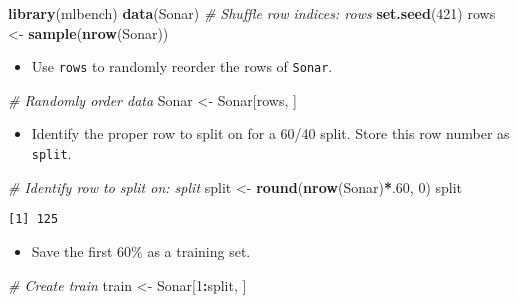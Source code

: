 \documentclass[
]{book}
\newenvironment{Shaded}{\begin{snugshade}}{\end{snugshade}}
\newcommand{\CommentTok}[1]{\textcolor[rgb]{0.56,0.35,0.01}{\textit{#1}}}
\newcommand{\DecValTok}[1]{\textcolor[rgb]{0.00,0.00,0.81}{#1}}
\newcommand{\KeywordTok}[1]{\textcolor[rgb]{0.13,0.29,0.53}{\textbf{#1}}}
\newcommand{\NormalTok}[1]{#1}
\newcommand{\OperatorTok}[1]{\textcolor[rgb]{0.81,0.36,0.00}{\textbf{#1}}}
\newcommand{\StringTok}[1]{\textcolor[rgb]{0.31,0.60,0.02}{#1}}
\providecommand{\tightlist}{%
  \setlength{\itemsep}{0pt}\setlength{\parskip}{0pt}}
\begin{document}
\begin{Shaded}
\begin{Highlighting}[]
\KeywordTok{library}\NormalTok{(mlbench)}
\KeywordTok{data}\NormalTok{(Sonar)}
\CommentTok{# Shuffle row indices: rows}
\KeywordTok{set.seed}\NormalTok{(}\DecValTok{421}\NormalTok{)}
\NormalTok{rows <-}\StringTok{ }\KeywordTok{sample}\NormalTok{(}\KeywordTok{nrow}\NormalTok{(Sonar))}
\end{Highlighting}
\end{Shaded}

\begin{itemize}
\tightlist
\item
  Use \texttt{rows} to randomly reorder the rows of \texttt{Sonar}.
\end{itemize}

\begin{Shaded}
\begin{Highlighting}[]
\CommentTok{# Randomly order data}
\NormalTok{Sonar <-}\StringTok{ }\NormalTok{Sonar[rows, ]}
\end{Highlighting}
\end{Shaded}

\begin{itemize}
\tightlist
\item
  Identify the proper row to split on for a 60/40 split. Store this row number as \texttt{split}.
\end{itemize}

\begin{Shaded}
\begin{Highlighting}[]
\CommentTok{# Identify row to split on: split}
\NormalTok{split <-}\StringTok{ }\KeywordTok{round}\NormalTok{(}\KeywordTok{nrow}\NormalTok{(Sonar)}\OperatorTok{*}\NormalTok{.}\DecValTok{60}\NormalTok{, }\DecValTok{0}\NormalTok{)}
\NormalTok{split}
\end{Highlighting}
\end{Shaded}

\begin{verbatim}
[1] 125
\end{verbatim}

\begin{itemize}
\tightlist
\item
  Save the first 60\% as a training set.
\end{itemize}

\begin{Shaded}
\begin{Highlighting}[]
\CommentTok{# Create train}
\NormalTok{train <-}\StringTok{ }\NormalTok{Sonar[}\DecValTok{1}\OperatorTok{:}\NormalTok{split, ]}
\end{Highlighting}
\end{Shaded}
\end{document}

